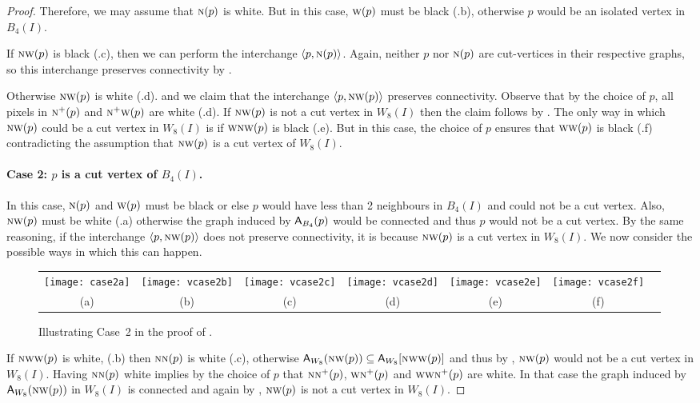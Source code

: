 \documentclass[lotsofwhite,charterfonts]{patmorin}
\newcommand{\N}{\textsc{n}}
\newcommand{\W}{\textsc{w}}
\newcommand{\NW}{\textsc{nw}}
\newcommand{\ic}[2]{\langle #1,#2 \rangle}
\newcommand{\A}[2]{\ensuremath{\protect\textup{\textsf{A}}_{#2}(#1)}}
\newcommand{\AC}[2]{\ensuremath{\protect\textup{\textsf{A}}_{#2}[#1]}}
\newcommand{\se}{\ensuremath{\subseteq}}
\begin{document}
\begin{proof}
Therefore, we may assume that $\N(p)$ is white.  But in this case,
$\W(p)$ must be black (.b), otherwise $p$ would be an isolated vertex in $B_4(I)$.

If $\NW(p)$ is black (.c), then we can perform the
interchange $\ic{p}{\N(p)}$.  Again, neither $p$ nor $\N(p)$ are
cut-vertices in their respective graphs, so this interchange preserves
connectivity by .

Otherwise $\NW(p)$ is white (.d). and we claim that the
interchange $\ic{p}{\NW(p)}$ preserves connectivity. Observe that by the choice of $p$, all pixels in
$\N^+(p)$ and $\N^+\W(p)$ are white (.d). If $\NW(p)$
is not a cut vertex in $W_8(I)$ then the claim follows by
.  The only way in which $\NW(p)$ could be a cut
vertex in $W_8(I)$ is if $\W\NW(p)$ is black (.e). But
in this case, the choice of $p$ ensures that $\W\W(p)$ is black
(.f) contradicting the assumption that  $\NW(p)$ is a
cut vertex of $W_8(I)$.

\paragraph{Case 2: $p$ is a cut vertex of $B_4(I)$.} In this case,
$\N(p)$ and $\W(p)$ must be black or else $p$ would have less than 2
neighbours in $B_4(I)$ and could not be a cut vertex.  Also, $\NW(p)$
must be white (.a) otherwise the graph induced by
\A{p}{B_4} would be connected and thus $p$ would not be a cut vertex.
By the same reasoning, if the interchange $\ic{p}{\NW(p)}$ does not
preserve connectivity, it is because $\NW(p)$ is a cut vertex in
$W_8(I)$.  We now consider the possible ways in which this can happen.

\begin{figure}[htbp]
\begin{center}
\begin{tabular}{ccccccc}
\texttt{[image: case2a]} & 
\texttt{[image: vcase2b]} & 
\texttt{[image: vcase2c]} & 
\texttt{[image: vcase2d]} & 
\texttt{[image: vcase2e]} & 
\texttt{[image: vcase2f]} \\
(a) & (b) & (c) & (d) & (e) & (f)
\end{tabular}
\end{center}
\caption{Illustrating Case~2 in the proof of .}
\end{figure}

If $\NW\W(p)$ is white, (.b) then $\N\N(p)$ is white
(.c), otherwise $\A{\NW(p)}{W_8}\se
\AC{\NW\W(p)}{W_8}$ and thus by , $\NW(p)$ would not
be a cut vertex in $W_8(I)$. Having $\N\N(p)$ white implies by the
choice of $p$ that $\N\N^+(p)$, $\W\N^+(p)$ and $\W\W\N^+(p)$ are
white. In that case the graph induced by \A{\NW(p)}{W_8} in $W_8(I)$
is connected and again by , $\NW(p)$ is not a cut
vertex in $W_8(I)$.



\end{proof}
\end{document}
